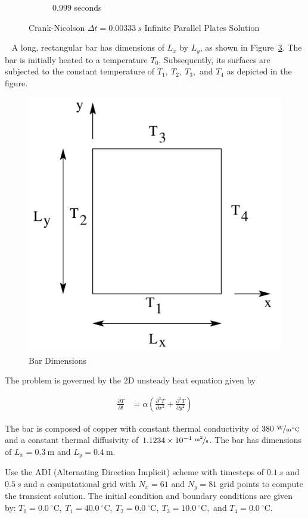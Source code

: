 \documentclass[addpoints]{exam}
\newcommand{\Dt}{\Delta t}
\begin{document}
\begin{questions}
\begin{parts}
\begin{solution}
\begin{itemize}
\begin{figure}[H]
\begin{subfigure}{.5\textwidth}
  \caption{$0.999$ seconds}
  \label{fig:1.0_CN2}
\end{subfigure}
\caption{Crank-Nicolson $\Dt = 0.00333\ s$ Infinite Parallel Plates Solution}
\label{fig:CN2}
\end{figure}
\end{itemize}
\end{solution}

\end{parts}
\ \newpage
{}
A long, rectangular bar has dimensions of $L_{x}$ by $L_{y}$, as shown in Figure~\ref{fig:bar}. The bar is initially heated to a temperature $T_{0}$. Subsequently, its surfaces are subjected to the constant temperature of $T_{1},\ T_{2},\ T_{3},$ and $T_{4}$ as depicted in the figure.

\begin{figure}[H]
\centering
\includegraphics[width=.4\textwidth]{fig1.png}
\caption{Bar Dimensions}
\label{fig:bar}
\end{figure}

The problem is governed by the 2D unsteady heat equation given by

\begin{align}
\frac{\partial T}{\partial t} &= \alpha\left(\frac{\partial ^{2}T}{\partial x^{2}} + \frac{\partial^{2}T}{\partial y^{2}}\right)\label{eq:heateq}
\end{align}

The bar is composed of copper with constant thermal conductivity of $380\ \unitfrac{W}{m^{\circ}C}$ and a constant thermal diffusivity of $1.1234\times 10^{-4}\ \unitfrac{m^{2}}{s}$. The bar has dimensions of $L_{x}=0.3\ \text{m}$ and $L_{y} = 0.4\ \text{m}$.

Use the ADI (Alternating Direction Implicit) scheme with timesteps of $0.1\ s$ and $0.5\ s$ and a computational grid with $N_{x}=61$ and $N_{y}=81$ grid points to compute the transient solution. The initial condition and boundary conditions are given by: $T_{0}= 0.0\ ^{\circ}\text{C},\ T_{1}=40.0\ ^{\circ}\text{C},\ T_{2}=0.0\ ^{\circ}\text{C},\ T_{3}=10.0\ ^{\circ}\text{C},$ and $T_{4}=0.0\ ^{\circ}\text{C}$.


\end{questions}
\end{document}
